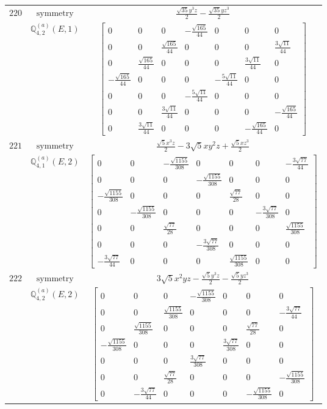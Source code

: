 \documentclass[fleqn,8pt,landscape]{jsarticle}
\begin{document}
\begin{longtable}{ccc}
$ 220 $ & $ \text{symmetry} $ & $ \frac{\sqrt{35} y^{3} z}{2} - \frac{\sqrt{35} y z^{3}}{2} $ \\
$  $ & $ \mathbb{Q}_{4,2}^{(a)}(E,1) $ & $ \begin{bmatrix} 0 & 0 & 0 & - \frac{\sqrt{165}}{44} & 0 & 0 & 0 \\ 0 & 0 & \frac{\sqrt{165}}{44} & 0 & 0 & 0 & \frac{3 \sqrt{11}}{44} \\ 0 & \frac{\sqrt{165}}{44} & 0 & 0 & 0 & \frac{3 \sqrt{11}}{44} & 0 \\ - \frac{\sqrt{165}}{44} & 0 & 0 & 0 & - \frac{5 \sqrt{11}}{44} & 0 & 0 \\ 0 & 0 & 0 & - \frac{5 \sqrt{11}}{44} & 0 & 0 & 0 \\ 0 & 0 & \frac{3 \sqrt{11}}{44} & 0 & 0 & 0 & - \frac{\sqrt{165}}{44} \\ 0 & \frac{3 \sqrt{11}}{44} & 0 & 0 & 0 & - \frac{\sqrt{165}}{44} & 0 \end{bmatrix} $ \\ \hline
$ 221 $ & $ \text{symmetry} $ & $ \frac{\sqrt{5} x^{3} z}{2} - 3 \sqrt{5} x y^{2} z + \frac{\sqrt{5} x z^{3}}{2} $ \\
$  $ & $ \mathbb{Q}_{4,1}^{(a)}(E,2) $ & $ \begin{bmatrix} 0 & 0 & - \frac{\sqrt{1155}}{308} & 0 & 0 & 0 & - \frac{3 \sqrt{77}}{44} \\ 0 & 0 & 0 & - \frac{\sqrt{1155}}{308} & 0 & 0 & 0 \\ - \frac{\sqrt{1155}}{308} & 0 & 0 & 0 & \frac{\sqrt{77}}{28} & 0 & 0 \\ 0 & - \frac{\sqrt{1155}}{308} & 0 & 0 & 0 & - \frac{3 \sqrt{77}}{308} & 0 \\ 0 & 0 & \frac{\sqrt{77}}{28} & 0 & 0 & 0 & \frac{\sqrt{1155}}{308} \\ 0 & 0 & 0 & - \frac{3 \sqrt{77}}{308} & 0 & 0 & 0 \\ - \frac{3 \sqrt{77}}{44} & 0 & 0 & 0 & \frac{\sqrt{1155}}{308} & 0 & 0 \end{bmatrix} $ \\ \hline
$ 222 $ & $ \text{symmetry} $ & $ 3 \sqrt{5} x^{2} y z - \frac{\sqrt{5} y^{3} z}{2} - \frac{\sqrt{5} y z^{3}}{2} $ \\
$  $ & $ \mathbb{Q}_{4,2}^{(a)}(E,2) $ & $ \begin{bmatrix} 0 & 0 & 0 & - \frac{\sqrt{1155}}{308} & 0 & 0 & 0 \\ 0 & 0 & \frac{\sqrt{1155}}{308} & 0 & 0 & 0 & - \frac{3 \sqrt{77}}{44} \\ 0 & \frac{\sqrt{1155}}{308} & 0 & 0 & 0 & \frac{\sqrt{77}}{28} & 0 \\ - \frac{\sqrt{1155}}{308} & 0 & 0 & 0 & \frac{3 \sqrt{77}}{308} & 0 & 0 \\ 0 & 0 & 0 & \frac{3 \sqrt{77}}{308} & 0 & 0 & 0 \\ 0 & 0 & \frac{\sqrt{77}}{28} & 0 & 0 & 0 & - \frac{\sqrt{1155}}{308} \\ 0 & - \frac{3 \sqrt{77}}{44} & 0 & 0 & 0 & - \frac{\sqrt{1155}}{308} & 0 \end{bmatrix} $ \\ \hline

\end{longtable}
\end{document}
